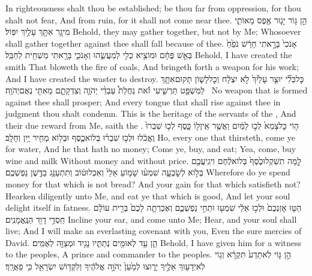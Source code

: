 {In righteousness shalt thou be established; be thou far from oppression, for thou shalt not fear, And from ruin, for it shall not come near thee.}
{הֵ֣ן גּ֥וֹר יָג֛וּר אֶ֖פֶס מֵאוֹתִ֑י מִי\maqqaf גָ֥ר אִתָּ֖ךְ עָלַ֥יִךְ יִפּֽוֹל׃}
{Behold, they may gather together, but not by Me; Whosoever shall gather together against thee shall fall because of thee.}
{ אָנֹכִי֙ בָּרָ֣אתִי חָרָ֔שׁ נֹפֵ֙חַ֙ בְּאֵ֣שׁ פֶּחָ֔ם וּמוֹצִ֥יא כְלִ֖י לְמַעֲשֵׂ֑הוּ וְאָנֹכִ֛י בָּרָ֥אתִי מַשְׁחִ֖ית לְחַבֵּֽל׃}
{Behold, I have created the smith That bloweth the fire of coals, And bringeth forth a weapon for his work; And I have created the waster to destroy.}
{כׇּל\maqqaf כְּלִ֞י יוּצַ֤ר עָלַ֙יִךְ֙ לֹ֣א יִצְלָ֔ח וְכׇל\maqqaf לָשׁ֛וֹן תָּקוּם\maqqaf אִתָּ֥ךְ לַמִּשְׁפָּ֖ט תַּרְשִׁ֑יעִי זֹ֡את נַחֲלַת֩ עַבְדֵ֨י יְהֹוָ֧ה וְצִדְקָתָ֛ם מֵאִתִּ֖י נְאֻם\maqqaf יְהֹוָֽה׃ \setuma }
{No weapon that is formed against thee shall prosper; And every tongue that shall rise against thee in judgment thou shalt condemn. This is the heritage of the servants of the \lord, And their due reward from Me, saith the \lord.}
\newperek
{}
{ה֤וֹי כׇּל\maqqaf צָמֵא֙ לְכ֣וּ לַמַּ֔יִם וַאֲשֶׁ֥ר אֵֽין\maqqaf ל֖וֹ כָּ֑סֶף לְכ֤וּ שִׁבְרוּ֙ וֶאֱכֹ֔לוּ וּלְכ֣וּ שִׁבְר֗וּ בְּלוֹא\maqqaf כֶ֛סֶף וּבְל֥וֹא מְחִ֖יר יַ֥יִן וְחָלָֽב׃}
{Ho, every one that thirsteth, come ye for water, And he that hath no money; Come ye, buy, and eat; Yea, come, buy wine and milk Without money and without price.}
{לָ֤מָּה תִשְׁקְלוּ\maqqaf כֶ֙סֶף֙ בְּלוֹא\maqqaf לֶ֔חֶם וִיגִֽיעֲכֶ֖ם בְּל֣וֹא לְשׇׂבְעָ֑ה שִׁמְע֨וּ שָׁמ֤וֹעַ אֵלַי֙ וְאִכְלוּ\maqqaf ט֔וֹב וְתִתְעַנַּ֥ג בַּדֶּ֖שֶׁן נַפְשְׁכֶֽם׃}
{Wherefore do ye spend money for that which is not bread? And your gain for that which satisfieth not? Hearken diligently unto Me, and eat ye that which is good, And let your soul delight itself in fatness.}
{הַטּ֤וּ אׇזְנְכֶם֙ וּלְכ֣וּ אֵלַ֔י שִׁמְע֖וּ וּתְחִ֣י נַפְשְׁכֶ֑ם וְאֶכְרְתָ֤ה לָכֶם֙ בְּרִ֣ית עוֹלָ֔ם חַֽסְדֵ֥י דָוִ֖ד הַנֶּֽאֱמָנִֽים׃}
{Incline your ear, and come unto Me; Hear, and your soul shall live; And I will make an everlasting covenant with you, Even the sure mercies of David.}
{הֵ֛ן עֵ֥ד לְאוּמִּ֖ים נְתַתִּ֑יו נָגִ֥יד וּמְצַוֵּ֖ה לְאֻמִּֽים׃}
{Behold, I have given him for a witness to the peoples, A prince and commander to the peoples.}
{הֵ֣ן גּ֤וֹי לֹֽא\maqqaf תֵדַע֙ תִּקְרָ֔א וְג֥וֹי לֹֽא\maqqaf יְדָע֖וּךָ אֵלֶ֣יךָ יָר֑וּצוּ לְמַ֙עַן֙ יְהֹוָ֣ה אֱלֹהֶ֔יךָ וְלִקְד֥וֹשׁ יִשְׂרָאֵ֖ל כִּ֥י פֵאֲרָֽךְ׃ \setuma }
